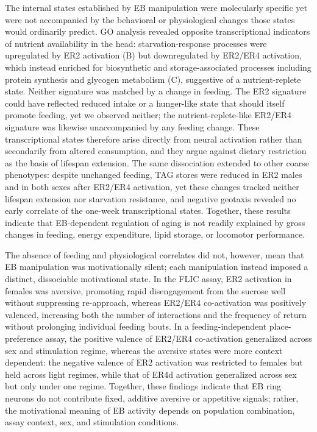 The internal states established by EB manipulation were molecularly specific yet were not accompanied by the behavioral or physiological changes those states would ordinarily predict.
GO analysis revealed opposite transcriptional indicators of nutrient availability in the head: starvation-response processes were upregulated by ER2 activation (B) but downregulated by ER2/ER4 activation, which instead enriched for biosynthetic and storage-associated processes including protein synthesis and glycogen metabolism (C), suggestive of a nutrient-replete state.
Neither signature was matched by a change in feeding.
The ER2 signature could have reflected reduced intake or a hunger-like state that should itself promote feeding, yet we observed neither; the nutrient-replete-like ER2/ER4 signature was likewise unaccompanied by any feeding change.
These transcriptional states therefore arise directly from neural activation rather than secondarily from altered consumption, and they argue against dietary restriction as the basis of lifespan extension.
The same dissociation extended to other coarse phenotypes: despite unchanged feeding, TAG stores were reduced in ER2 males and in both sexes after ER2/ER4 activation, yet these changes tracked neither lifespan extension nor starvation resistance, and negative geotaxis revealed no early correlate of the one-week transcriptional states.
Together, these results indicate that EB-dependent regulation of aging is not readily explained by gross changes in feeding, energy expenditure, lipid storage, or locomotor performance.

The absence of feeding and physiological correlates did not, however, mean that EB manipulation was motivationally silent; each manipulation instead imposed a distinct, dissociable motivational state.
In the FLIC assay, ER2 activation in females was aversive, promoting rapid disengagement from the sucrose well without suppressing re-approach, whereas ER2/ER4 co-activation was positively valenced, increasing both the number of interactions and the frequency of return without prolonging individual feeding bouts.
In a feeding-independent place-preference assay, the positive valence of ER2/ER4 co-activation generalized across sex and stimulation regime, whereas the aversive states were more context dependent: the negative valence of ER2 activation was restricted to females but held across light regimes, while that of ER4d activation generalized across sex but only under one regime.
Together, these findings indicate that EB ring neurons do not contribute fixed, additive aversive or appetitive signals; rather, the motivational meaning of EB activity depends on population combination, assay context, sex, and stimulation conditions.

